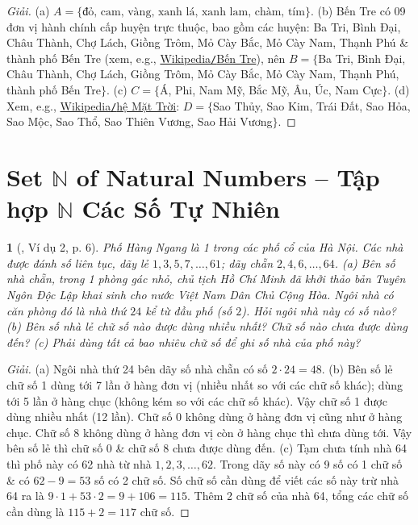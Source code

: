 \documentclass{article}
\newtheorem{baitoan}{}
\begin{document}
\begin{proof}[Giải]
	(a) $A = \{\mbox{đỏ, cam, vàng, xanh lá, xanh lam, chàm, tím}\}$. (b) Bến Tre có 09 đơn vị hành chính cấp huyện trực thuộc, bao gồm các huyện: Ba Tri, Bình Đại, Châu Thành, Chợ Lách, Giồng Trôm, Mỏ Cày Bắc, Mỏ Cày Nam, Thạnh Phú \& thành phố Bến Tre (xem, e.g., \href{https://vi.wikipedia.org/wiki/B%E1%BA%BFn_Tre}{Wikipedia{\tt/}Bến Tre}), nên $B = \{$Ba Tri, Bình Đại, Châu Thành, Chợ Lách, Giồng Trôm, Mỏ Cày Bắc, Mỏ Cày Nam, Thạnh Phú, thành phố Bến Tre$\}$. (c) $C = \{$Á, Phi, Nam Mỹ, Bắc Mỹ, Âu, Úc, Nam Cực$\}$. (d) Xem, e.g., \href{https://vi.wikipedia.org/wiki/H%E1%BB%87_M%E1%BA%B7t_Tr%E1%BB%9Di}{Wikipedia{\tt/}hệ Mặt Trời}: $D = \{$Sao Thủy, Sao Kim, Trái Đất, Sao Hỏa, Sao Mộc, Sao Thổ, Sao Thiên Vương, Sao Hải Vương$\}$.
\end{proof}


\section{Set $\mathbb{N}$ of Natural Numbers -- Tập hợp $\mathbb{N}$ Các Số Tự Nhiên}

\begin{baitoan}[\cite{Tuyen_Toan_6}, Ví dụ 2, p. 6]
	Phố Hàng Ngang là 1 trong các phố cổ của Hà Nội. Các nhà được đánh số liên tục, dãy lẻ $1,3,5,7,\ldots,61$; dãy chẵn $2,4,6,\ldots,64$. (a) Bên số nhà chẵn, trong 1 phòng gác nhỏ, chủ tịch Hồ Chí Minh đã khởi thảo bản Tuyên Ngôn Độc Lập khai sinh cho nước Việt Nam Dân Chủ Cộng Hòa. Ngôi nhà có căn phòng đó là nhà thứ $24$ kể từ đầu phố (số $2$). Hỏi ngôi nhà này có số nào? (b) Bên số nhà lẻ chữ số nào được dùng nhiều nhất? Chữ số nào chưa được dùng đến? (c) Phải dùng tất cả bao nhiêu chữ số để ghi số nhà của phố này?
\end{baitoan}

\begin{proof}[Giải]
	(a) Ngôi nhà thứ 24 bên dãy số nhà chẵn có số $2\cdot24 = 48$. (b) Bên số lẻ chữ số 1 dùng tới 7 lần ở hàng đơn vị (nhiều nhất so với các chữ số khác); dùng tới 5 lần ở hàng chục (không kém so với các chữ số khác). Vậy chữ số 1 được dùng nhiều nhất (12 lần). Chữ số 0 không dùng ở hàng đơn vị cũng như ở hàng chục. Chữ số 8 không dùng ở hàng đơn vị còn ở hàng chục thì chưa dùng tới. Vậy bên số lẻ thì chữ số 0 \& chữ số 8 chưa được dùng đến. (c) Tạm chưa tính nhà 64 thì phố này có 62 nhà từ nhà $1,2,3,\ldots,62$. Trong dãy số này có 9 số có 1 chữ số \& có $62 - 9 = 53$ số có 2 chữ số. Số chữ số cần dùng để viết các số này trừ nhà 64 ra là $9\cdot1 + 53\cdot2 = 9 + 106 = 115$. Thêm 2 chữ số của nhà 64, tổng các chữ số cần dùng là $115 + 2 = 117$ chữ số.
\end{proof}
\end{document}
